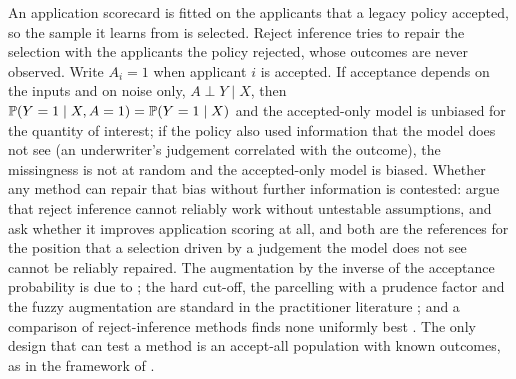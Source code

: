 An application scorecard is fitted on the applicants that a legacy policy accepted, so the sample it learns from is selected.
Reject inference tries to repair the selection with the applicants the policy rejected, whose outcomes are never observed. Write
$A_i=1$ when applicant $i$ is accepted. If acceptance depends on the inputs and on noise only, $A\perp Y\mid X$, then
$\mathbb{P}(Y=1\mid X,A=1)=\mathbb{P}(Y=1\mid X)$ and the accepted-only model is unbiased for the quantity of interest; if the policy also
used information that the model does not see (an underwriter's judgement correlated with the outcome), the missingness is not at
random and the accepted-only model is biased. Whether any method can repair that bias without further information is contested:
\citet{credit-scoring:handhenley1993} argue that reject inference cannot reliably work without untestable assumptions, and
\citet{credit-scoring:crookbanasik2004} ask whether it improves application scoring at all, and both are the references for the
position that a selection driven by a judgement the model does not see cannot be reliably repaired. The augmentation by the
inverse of the acceptance probability is due to \citet{credit-scoring:banasikcrook2007}; the hard cut-off, the parcelling with a
prudence factor and the fuzzy augmentation are standard in the practitioner literature \citep{credit-scoring:siddiqi2017}; and a
comparison of reject-inference methods finds none uniformly best \citep{credit-scoring:ehrhardt2021}. The only design that can test a method is
an accept-all population with known outcomes, as in the framework of \citet{credit-scoring:kozodoi2025}.

